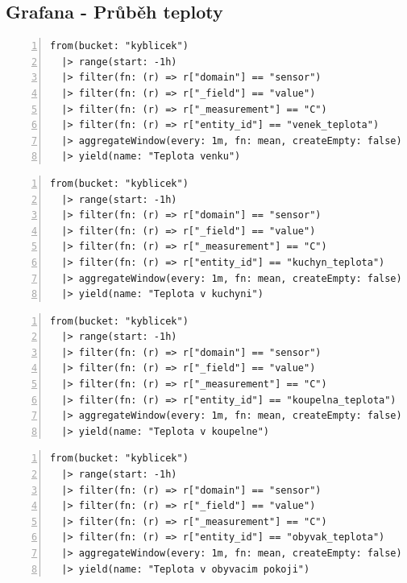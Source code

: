 \subsection{Grafana - Průběh teploty}
\begin{lstlisting}[language=flux, breaklines=true, numbers=left, numberstyle=\small, numbersep=10pt, frame=single, basicstyle=\ttfamily\small, caption={Grafana - Průběh teploty - Query A}, label={lst:grafanaTeplota}]
from(bucket: "kyblicek")
  |> range(start: -1h)
  |> filter(fn: (r) => r["domain"] == "sensor")
  |> filter(fn: (r) => r["_field"] == "value")
  |> filter(fn: (r) => r["_measurement"] == "C")
  |> filter(fn: (r) => r["entity_id"] == "venek_teplota")
  |> aggregateWindow(every: 1m, fn: mean, createEmpty: false)
  |> yield(name: "Teplota venku")
\end{lstlisting}
\begin{lstlisting}[language=flux, breaklines=true, numbers=left, numberstyle=\small, numbersep=10pt, frame=single, basicstyle=\ttfamily\small, caption={Grafana - Průběh teploty - Query B}, label={lst:grafanaTeplota}]
from(bucket: "kyblicek")
  |> range(start: -1h)
  |> filter(fn: (r) => r["domain"] == "sensor")
  |> filter(fn: (r) => r["_field"] == "value")
  |> filter(fn: (r) => r["_measurement"] == "C")
  |> filter(fn: (r) => r["entity_id"] == "kuchyn_teplota")
  |> aggregateWindow(every: 1m, fn: mean, createEmpty: false)
  |> yield(name: "Teplota v kuchyni")
\end{lstlisting}
\begin{lstlisting}[language=flux, breaklines=true, numbers=left, numberstyle=\small, numbersep=10pt, frame=single, basicstyle=\ttfamily\small, caption={Grafana - Průběh teploty - Query C}, label={lst:grafanaTeplota}]
from(bucket: "kyblicek")
  |> range(start: -1h)
  |> filter(fn: (r) => r["domain"] == "sensor")
  |> filter(fn: (r) => r["_field"] == "value")
  |> filter(fn: (r) => r["_measurement"] == "C")
  |> filter(fn: (r) => r["entity_id"] == "koupelna_teplota")
  |> aggregateWindow(every: 1m, fn: mean, createEmpty: false)
  |> yield(name: "Teplota v koupelne")
\end{lstlisting}
\pagebreak
\begin{lstlisting}[language=flux, breaklines=true, numbers=left, numberstyle=\small, numbersep=10pt, frame=single, basicstyle=\ttfamily\small, caption={Grafana - Průběh teploty - Query D}, label={lst:grafanaTeplota}]
from(bucket: "kyblicek")
  |> range(start: -1h)
  |> filter(fn: (r) => r["domain"] == "sensor")
  |> filter(fn: (r) => r["_field"] == "value")
  |> filter(fn: (r) => r["_measurement"] == "C")
  |> filter(fn: (r) => r["entity_id"] == "obyvak_teplota")
  |> aggregateWindow(every: 1m, fn: mean, createEmpty: false)
  |> yield(name: "Teplota v obyvacim pokoji")
\end{lstlisting}
